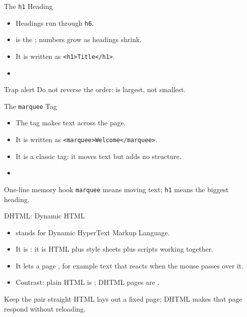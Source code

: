 \documentclass[aspectratio=169]{beamer}
\begin{document}
\begin{frame}{The \texttt{h1} Heading}
  \begin{itemize}
    \item Headings run  through \texttt{h6}.
    \item {} is the ; numbers
      grow as headings shrink.
    \item It is written as \texttt{<h1>Title</h1>}.
    \item {}
  \end{itemize}
  \begin{alertblock}{Trap alert}
    Do not reverse the order:  is largest, not smallest.
  \end{alertblock}
\end{frame}

\begin{frame}{The \texttt{marquee} Tag}
  \begin{itemize}
    \item The  tag makes text  across the page.
    \item It is written as \texttt{<marquee>Welcome</marquee>}.
    \item It is a classic  tag: it moves text but adds no
      structure.
    \item {}
  \end{itemize}
  \begin{block}{One-line memory hook}
    \texttt{marquee} means moving text; \texttt{h1} means the biggest heading.
  \end{block}
\end{frame}

\begin{frame}{DHTML: Dynamic HTML}
  \begin{itemize}
    \item {} stands for Dynamic HyperText Markup Language.
    \item It is : it is HTML plus style sheets
      plus scripts working together.
    \item It lets a page , for example text that
      reacts when the mouse passes over it.
    \item Contrast: plain HTML is ; DHTML pages are
      .
  \end{itemize}
  \begin{block}{Keep the pair straight}
    HTML lays out a fixed page; DHTML makes that page respond without reloading.
  \end{block}
\end{frame}
\end{document}
